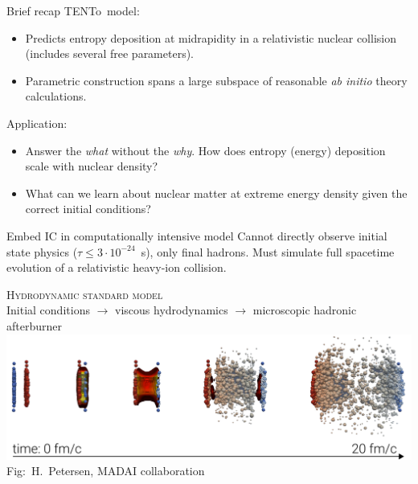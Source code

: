 \documentclass{beamer}
\newcommand{\trento}{T\raisebox{-0.3ex}{R}ENTo}
\begin{document}
\begin{frame}{Brief recap}{}
  {\color{theme} \trento\ model:}\\
  \begin{itemize}
    \item Predicts entropy deposition at midrapidity in a relativistic nuclear collision (includes several free parameters).
    \item Parametric construction spans a large subspace of reasonable \emph{ab initio} theory calculations.
  \end{itemize}
  \bigskip
  \textcolor{theme}{Application:}\\
  \begin{itemize}
    \item Answer the \emph{what} without the \emph{why}. How does entropy (energy) deposition scale with nuclear density?
    \item What can we learn about nuclear matter at extreme energy density given the correct initial conditions?
  \end{itemize}

\end{frame}

\begin{frame}{Embed IC in computationally intensive model}
  \bigskip
  Cannot directly observe initial state physics ($\tau \le 3 \cdot 10^{-24}$~s), only final hadrons. Must simulate full spacetime evolution of a relativistic heavy-ion collision. \\[3ex]

  \begin{center}
    \textcolor{theme}{\scshape Hydrodynamic standard model}\\
    {\scriptsize Initial conditions $\rightarrow$ viscous hydrodynamics $\rightarrow$ microscopic hadronic afterburner}\\[1ex]
    \includegraphics[width=\textwidth]{hic_picture1}\\
    {\tiny Fig:\ H.\ Petersen, MADAI collaboration}
  \end{center}

\end{frame}
\end{document}
